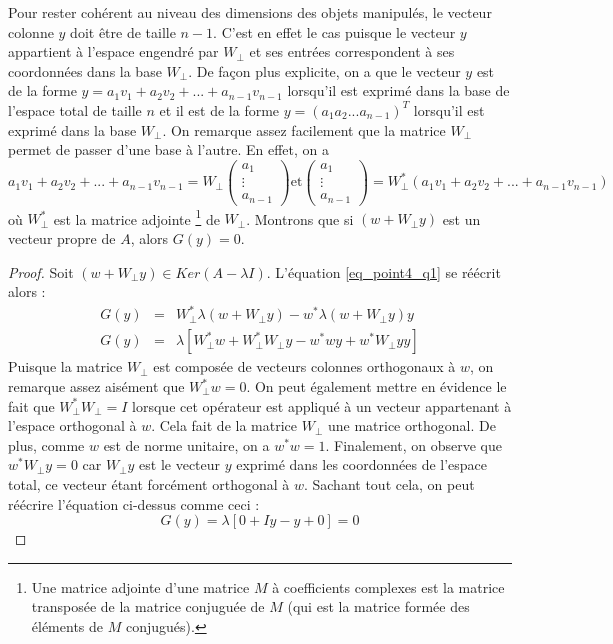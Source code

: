 Pour rester cohérent au niveau des dimensions des objets manipulés, le vecteur colonne $y$ doit être de taille $n-1$. C'est en effet le cas puisque le vecteur $y$ appartient à l'espace engendré par $W_{\bot}$ et ses entrées correspondent à ses coordonnées dans la base $W_{\bot}$. De façon plus explicite, on a que le vecteur $y$ est de la forme $y = a_1 v_1 + a_2 v_2 + ... + a_{n-1} v_{n-1}$ lorsqu'il est exprimé dans la base de l'espace total de taille $n$ et il est de la forme $y = (a_1 a_2 ... a_{n-1})^{T}$ lorsqu'il est exprimé dans la base $W_{\bot}$. On remarque assez facilement que la matrice $W_{\bot}$ permet de passer d'une base à l'autre. En effet, on a $$a_1 v_1 + a_2 v_2 + ... + a_{n-1} v_{n-1} = W_{\bot}
\left(\begin{array}{c}
a_1 \\
\vdots \\
a_{n-1}
\end{array}\right)
\text{et}
\left(\begin{array}{c}
a_1 \\
\vdots \\
a_{n-1}
\end{array}\right)
= W_{\bot}^*(a_1 v_1 + a_2 v_2 + ... + a_{n-1} v_{n-1})$$ où $W_{\bot}^*$ est la matrice adjointe \footnote{Une matrice adjointe d'une matrice $M$ à coefficients complexes est la matrice transposée de la matrice conjuguée de $M$ (qui est la matrice formée des éléments de $M$ conjugués).} de $W_{\bot}$.
Montrons que si $(w+ W_{\bot}y)$ est un vecteur propre de $A$, alors $G(y)=0$.
\begin{proof}
Soit $(w+ W_{\bot}y) \in Ker(A-\lambda I)$. L'équation \ref{eq_point4_q1} se réécrit alors : 
\begin{eqnarray}
G(y) &=& W_{\bot}^* \lambda (w+ W_{\bot}y) - w^*\lambda (w+ W_{\bot}y)y\\
G(y) &=& \lambda [W_{\bot}^* w + W_{\bot}^*W_{\bot}y - w^* wy + w^* W_{\bot}yy ] 
\end{eqnarray}
Puisque la matrice $W_{\bot}$ est composée de vecteurs colonnes orthogonaux à $w$, on remarque assez aisément que $W_{\bot}^*w = 0$. On peut également mettre en évidence le fait que $W_{\bot}^* W_{\bot} = I$ lorsque cet opérateur est appliqué à un vecteur appartenant à l'espace orthogonal à $w$. Cela fait de la matrice $W_{\bot}$ une matrice orthogonal. De plus, comme $w$ est de norme unitaire, on a $w^* w=1$. Finalement, on observe que $w^*W_{\bot}y = 0$ car $W_{\bot}y$ est le vecteur $y$ exprimé dans les coordonnées de l'espace total, ce vecteur étant forcément orthogonal à $w$. Sachant tout cela, on peut réécrire l'équation ci-dessus comme ceci :
$$G(y) = \lambda [0 + Iy - y + 0] = 0 $$
\end{proof}


